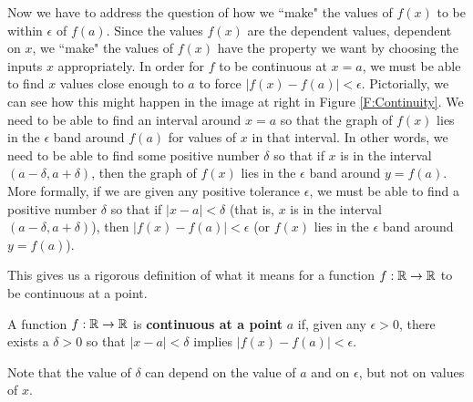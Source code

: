 Now we have to address the question of how we ``make" the values of $f(x)$ to be within $\epsilon$ of $f(a)$. Since the values $f(x)$ are the dependent values, dependent on $x$, we ``make" the values of $f(x)$ have the property we want by choosing the inputs $x$ appropriately.  In order for $f$ to be continuous at $x=a$, we must be able to find $x$ values close enough to $a$ to force $| f(x) - f(a) | < \epsilon$. Pictorially, we can see how this might happen in the image at right in Figure \ref{F:Continuity}. We need to be able to find an interval around $x=a$ so that the graph of $f(x)$ lies in the $\epsilon$ band around $f(a)$ for values of $x$ in that interval. In other words, we need to be able to find some positive number $\delta$ so that if $x$ is in the interval $(a-\delta, a+\delta)$, then the graph of $f(x)$ lies in the $\epsilon$ band around $y=f(a)$. More formally, if we are given any positive tolerance $\epsilon$, we must be able to find a positive number $\delta$ so that if $| x-a | < \delta$ (that is, $x$ is in the interval $(a-\delta, a+\delta)$), then $| f(x) - f(a) | < \epsilon$ (or $f(x)$ lies in the $\epsilon$ band around $y=f(a)$).   

This gives us a rigorous definition of what it means for a function $f: \mathbb{R} \to \mathbb{R}$ to be continuous at a point.

\begin{definition} \label{def:epsilon_delta_continuity} A function $f : \mathbb{R} \to \mathbb{R}$ is \textbf{continuous at a point} $a$ if, given any $\epsilon > 0$, there exists a $\delta > 0$ so that $| x - a | < \delta$ implies $| f(x) - f(a)| < \epsilon$.
\end{definition}

Note that the value of $\delta$ can depend on the value of $a$ and on $\epsilon$, but not on values of $x$. 

